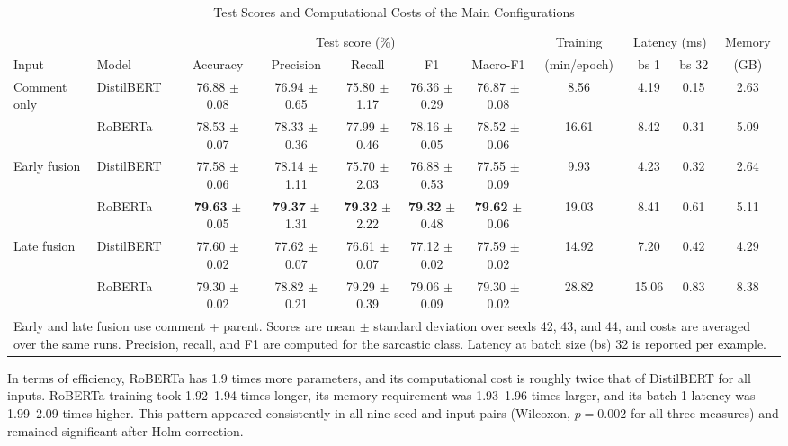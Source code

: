\documentclass[conference]{IEEEtran}
\begin{document}
\begin{table}[t]
\caption{Test Scores and Computational Costs of the Main Configurations}
\label{tab:main}
\centering
\footnotesize
\setlength{\tabcolsep}{3pt}
\begin{tabular}{llccccccccc}
\hline
 & & \multicolumn{5}{c}{Test score (\%)} & Training & \multicolumn{2}{c}{Latency (ms)} & Memory \\
Input & Model & Accuracy & Precision & Recall & F1 & Macro-F1 & (min/epoch) & bs 1 & bs 32 & (GB) \\
\hline
Comment only & DistilBERT & 76.88 $\pm$ 0.08 & 76.94 $\pm$ 0.65 & 75.80 $\pm$ 1.17 & 76.36 $\pm$ 0.29 & 76.87 $\pm$ 0.08 & 8.56 & 4.19 & 0.15 & 2.63 \\
 & RoBERTa & 78.53 $\pm$ 0.07 & 78.33 $\pm$ 0.36 & 77.99 $\pm$ 0.46 & 78.16 $\pm$ 0.05 & 78.52 $\pm$ 0.06 & 16.61 & 8.42 & 0.31 & 5.09 \\
Early fusion & DistilBERT & 77.58 $\pm$ 0.06 & 78.14 $\pm$ 1.11 & 75.70 $\pm$ 2.03 & 76.88 $\pm$ 0.53 & 77.55 $\pm$ 0.09 & 9.93 & 4.23 & 0.32 & 2.64 \\
 & RoBERTa & \textbf{79.63} $\pm$ 0.05 & \textbf{79.37} $\pm$ 1.31 & \textbf{79.32} $\pm$ 2.22 & \textbf{79.32} $\pm$ 0.48 & \textbf{79.62} $\pm$ 0.06 & 19.03 & 8.41 & 0.61 & 5.11 \\
Late fusion & DistilBERT & 77.60 $\pm$ 0.02 & 77.62 $\pm$ 0.07 & 76.61 $\pm$ 0.07 & 77.12 $\pm$ 0.02 & 77.59 $\pm$ 0.02 & 14.92 & 7.20 & 0.42 & 4.29 \\
 & RoBERTa & 79.30 $\pm$ 0.02 & 78.82 $\pm$ 0.21 & 79.29 $\pm$ 0.39 & 79.06 $\pm$ 0.09 & 79.30 $\pm$ 0.02 & 28.82 & 15.06 & 0.83 & 8.38 \\
\hline
\multicolumn{11}{p{0.97\textwidth}}{Early and late fusion use comment + parent. Scores are mean $\pm$ standard deviation over seeds 42, 43, and 44, and costs are averaged over the same runs. Precision, recall, and F1 are computed for the sarcastic class. Latency at batch size (bs) 32 is reported per example.}
\end{tabular}
\end{table}

In terms of efficiency, RoBERTa has 1.9 times more parameters, and its computational cost is roughly twice that of DistilBERT for all inputs. RoBERTa training took 1.92--1.94 times longer, its memory requirement was 1.93--1.96 times larger, and its batch-1 latency was 1.99--2.09 times higher. This pattern appeared consistently in all nine seed and input pairs (Wilcoxon, $p = 0.002$ for all three measures) and remained significant after Holm correction.
\end{document}
